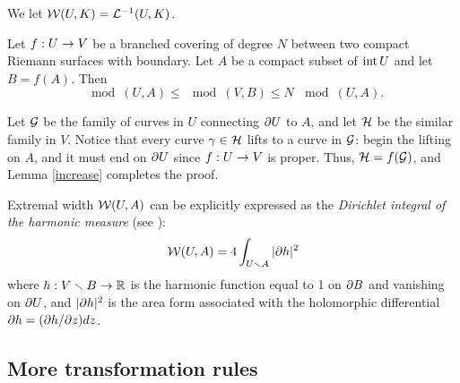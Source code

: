  We let ${\cal W}(U,K) = {\cal L}^{-1}(U,K)$.

\begin{lem}\label{modulus transform}
 Let $f: U\rightarrow V$ be a branched covering of degree $N$ between two compact Riemann surfaces with boundary.
Let $A$ be a compact subset of $\operatorname{int} U$ and let $B=f(A)$.  
Then 
$$
   \mod(U,  A)\leq \mod(V, B) \leq N \, \mod(U,A).
$$
\end{lem}

\begin{pf}
  Let ${\cal G}$ be the family of curves in $U$ connecting $\partial U$ to $A$,
and let ${\cal H}$ be the similar family in $V$.  
Notice that every curve $\gamma\in {\cal H}$ lifts to a curve in ${\cal G}$:
begin the lifting on $A$, and it must end on $\partial U$ since $f: U\rightarrow V$ is proper. 
Thus,  ${\cal H}= f({\cal G})$, and  Lemma \ref{increase} completes the proof. 
\end{pf}

 Extremal width ${\cal W}(U,A)$ can be explicitly expressed as the
{\it Dirichlet integral of the harmonic measure} (see \cite[\S 4-9]{A}):
$$
      {\cal W} (U,A) = 4 \int_{U\smallsetminus A} |\partial h|^2 
$$ 
where $h: V\smallsetminus B \rightarrow {\Bbb R}$ is the harmonic function equal to 1 on $\partial B$ and vanishing on $\partial U$, 
and $|\partial h|^2$ is the area form associated with the holomorphic differential $\partial h = (\partial h/ \partial z) dz $.




\subsection{More transformation rules} 

